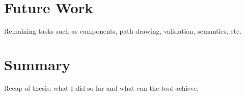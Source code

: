 \section{Future Work}

Remaining tasks such as components, path drawing, validation, semantics, etc.

\section{Summary}

Recap of thesis: what I did so far and what can the tool achieve.
